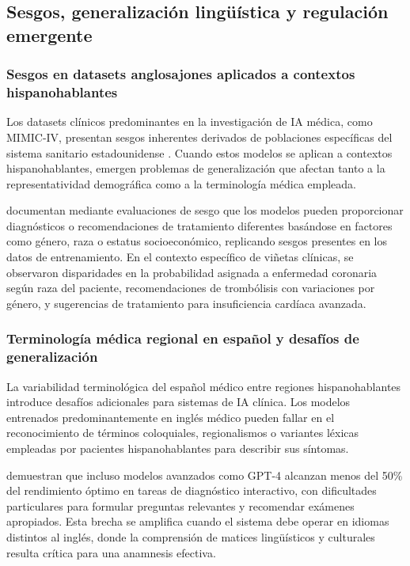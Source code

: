 \subsection{Sesgos, generalización lingüística y regulación emergente}
\label{subsec:sesgos_regulacion}

\subsubsection{Sesgos en datasets anglosajones aplicados a contextos hispanohablantes}

Los datasets clínicos predominantes en la investigación de \ac{IA} médica, como \ac{MIMIC}-IV, presentan sesgos inherentes derivados de poblaciones específicas del sistema sanitario estadounidense \parencite{fan2024aihospital}. Cuando estos modelos se aplican a contextos hispanohablantes, emergen problemas de generalización que afectan tanto a la representatividad demográfica como a la terminología médica empleada.

\textcite{arun2025ethical} documentan mediante evaluaciones de sesgo que los modelos pueden proporcionar diagnósticos o recomendaciones de tratamiento diferentes basándose en factores como género, raza o estatus socioeconómico, replicando sesgos presentes en los datos de entrenamiento. En el contexto específico de viñetas clínicas, se observaron disparidades en la probabilidad asignada a enfermedad coronaria según raza del paciente, recomendaciones de trombólisis con variaciones por género, y sugerencias de tratamiento para insuficiencia cardíaca avanzada.

\subsubsection{Terminología médica regional en español y desafíos de generalización}

La variabilidad terminológica del español médico entre regiones hispanohablantes introduce desafíos adicionales para sistemas de \ac{IA} clínica. Los modelos entrenados predominantemente en inglés médico pueden fallar en el reconocimiento de términos coloquiales, regionalismos o variantes léxicas empleadas por pacientes hispanohablantes para describir sus síntomas.

\textcite{fan2024aihospital} demuestran que incluso modelos avanzados como \acs{GPT}-4 alcanzan menos del 50\% del rendimiento óptimo en tareas de diagnóstico interactivo, con dificultades particulares para formular preguntas relevantes y recomendar exámenes apropiados. Esta brecha se amplifica cuando el sistema debe operar en idiomas distintos al inglés, donde la comprensión de matices lingüísticos y culturales resulta crítica para una anamnesis efectiva.

